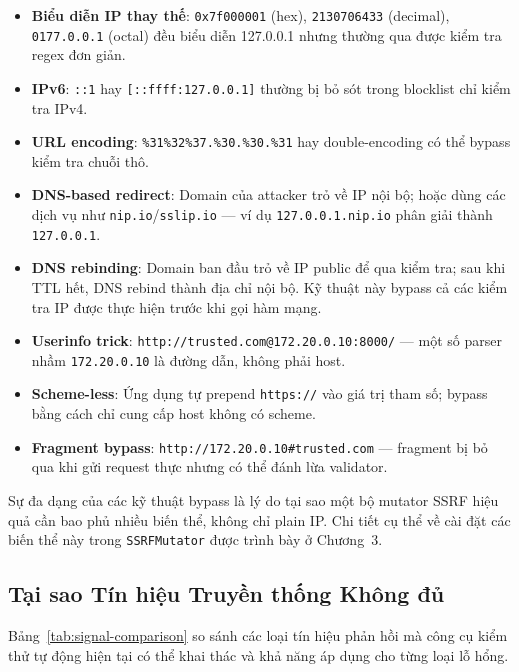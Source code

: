 \begin{itemize}
    \item \textbf{Biểu diễn IP thay thế}: \texttt{0x7f000001} (hex),
    \texttt{2130706433} (decimal), \texttt{0177.0.0.1} (octal) đều biểu diễn
    127.0.0.1 nhưng thường qua được kiểm tra regex đơn giản.
    \item \textbf{IPv6}: \texttt{::1} hay \texttt{[::ffff:127.0.0.1]} thường bị bỏ
    sót trong blocklist chỉ kiểm tra IPv4.
    \item \textbf{URL encoding}: \texttt{\%31\%32\%37.\%30.\%30.\%31} hay
    double-encoding có thể bypass kiểm tra chuỗi thô.
    \item \textbf{DNS-based redirect}: Domain của attacker trỏ về IP nội bộ; hoặc
    dùng các dịch vụ như \texttt{nip.io}/\texttt{sslip.io} --- ví dụ
    \texttt{127.0.0.1.nip.io} phân giải thành \texttt{127.0.0.1}.
    \item \textbf{DNS rebinding}: Domain ban đầu trỏ về IP public để qua kiểm tra;
    sau khi TTL hết, DNS rebind thành địa chỉ nội bộ. Kỹ thuật này bypass cả các
    kiểm tra IP được thực hiện trước khi gọi hàm mạng.
    \item \textbf{Userinfo trick}: \texttt{http://trusted.com@172.20.0.10:8000/} ---
    một số parser nhầm \texttt{172.20.0.10} là đường dẫn, không phải host.
    \item \textbf{Scheme-less}: Ứng dụng tự prepend \texttt{https://} vào giá trị
    tham số; bypass bằng cách chỉ cung cấp host không có scheme.
    \item \textbf{Fragment bypass}: \texttt{http://172.20.0.10\#trusted.com} ---
    fragment bị bỏ qua khi gửi request thực nhưng có thể đánh lừa validator.
\end{itemize}

Sự đa dạng của các kỹ thuật bypass là lý do tại sao một bộ mutator SSRF hiệu quả cần
bao phủ nhiều biến thể, không chỉ plain IP. Chi tiết cụ thể về cài đặt các biến thể
này trong \texttt{SSRFMutator} được trình bày ở Chương~3.

\subsection{Tại sao Tín hiệu Truyền thống Không đủ}

Bảng~\ref{tab:signal-comparison} so sánh các loại tín hiệu phản hồi mà công cụ kiểm
thử tự động hiện tại có thể khai thác và khả năng áp dụng cho từng loại lỗ hổng.

